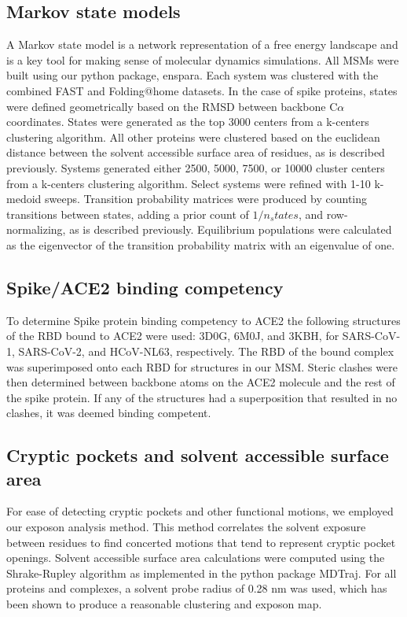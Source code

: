 \documentclass[../main.tex]{subfiles}
\begin{document}
    \subsection{Markov state models}
        A Markov state model is a network representation of a free energy landscape and is a key tool for making sense of molecular dynamics simulations\cite{Husic:2018iz}. All MSMs were built using our python package, enspara\cite{porter2018enspara}. Each system was clustered with the combined FAST and Folding@home datasets. In the case of spike proteins, states were defined geometrically based on the RMSD between backbone C$\alpha$ coordinates. States were generated as the top 3000 centers from a k-centers clustering algorithm. All other proteins were clustered based on the euclidean distance between the solvent accessible surface area of residues, as is described previously\cite{Porter:2019hv}. Systems generated either 2500, 5000, 7500, or 10000 cluster centers from a k-centers clustering algorithm. Select systems were refined with 1-10 k-medoid sweeps. Transition probability matrices were produced by counting transitions between states, adding a prior count of $1/n_states$, and row-normalizing, as is described previously\cite{Zimmerman:2018jn}. Equilibrium populations were calculated as the eigenvector of the transition probability matrix with an eigenvalue of one.

    \subsection{Spike/ACE2 binding competency}
        To determine Spike protein binding competency to ACE2 the following structures of the RBD bound to ACE2 were used: 3D0G, 6M0J, and 3KBH, for SARS-CoV-1, SARS-CoV-2, and HCoV-NL63, respectively. The RBD of the bound complex was superimposed onto each RBD for structures in our MSM. Steric clashes were then determined between backbone atoms on the ACE2 molecule and the rest of the spike protein. If any of the structures had a superposition that resulted in no clashes, it was deemed binding competent.


    \subsection{Cryptic pockets and solvent accessible surface area}
        For ease of detecting cryptic pockets and other functional motions, we employed our exposon analysis method\cite{Porter:2019hv}. This method correlates the solvent exposure between residues to find concerted motions that tend to represent cryptic pocket openings. Solvent accessible surface area calculations were computed using the Shrake-Rupley algorithm as implemented in the python package MDTraj\cite{McGibbon:2015fv}. For all proteins and complexes, a solvent probe radius of 0.28 nm was used, which has been shown to produce a reasonable clustering and exposon map\cite{Porter:2019hv}.
\end{document}
